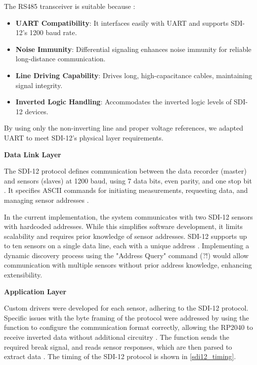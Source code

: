 The RS485 transceiver is suitable because \cite{AnalogDevicesMAX1487}:

\begin{itemize} 
    \item \textbf{UART Compatibility}: It interfaces easily with UART and supports SDI-12's 1200 baud rate. 
    \item \textbf{Noise Immunity}: Differential signaling enhances noise immunity for reliable long-distance communication. 
    \item \textbf{Line Driving Capability}: Drives long, high-capacitance cables, maintaining signal integrity. 
    \item \textbf{Inverted Logic Handling}: Accommodates the inverted logic levels of SDI-12 devices. 
\end{itemize}

By using only the non-inverting line and proper voltage references, we adapted UART to meet SDI-12's physical layer requirements.

\textbf{Data Link Layer}

The SDI-12 protocol defines communication between the data recorder (master) and sensors (slaves) at 1200 baud, using 7 data bits, even parity, and one stop bit \cite{sdi12_datasheet}. It specifies ASCII commands for initiating measurements, requesting data, and managing sensor addresses \cite{sdi12_datasheet}.

In the current implementation, the system communicates with two SDI-12 sensors with hardcoded addresses. While this simplifies software development, it limits scalability and requires prior knowledge of sensor addresses. SDI-12 supports up to ten sensors on a single data line, each with a unique address \cite{sdi12_datasheet}. Implementing a dynamic discovery process using the "Address Query" command (?!) would allow communication with multiple sensors without prior address knowledge, enhancing extensibility.

\textbf{Application Layer}

Custom drivers were developed for each sensor, adhering to the SDI-12 protocol. Specific issues with the byte framing of the protocol were addressed by using the 
 function to configure the communication format correctly, allowing the RP2040 
to receive inverted data without additional circuitry \cite{RaspberryPiPicoSDK}. 
The  function sends the required break signal, and  reads sensor responses, which are then parsed to extract data \cite{RaspberryPiPicoSDK}. The timing of the SDI-12 protocol is shown 
in \cref{sdi12_timing}.


